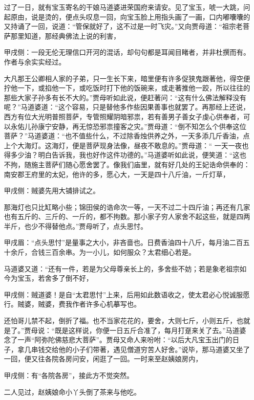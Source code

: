 \begin{parag}
    过了一日，就有宝玉寄名的干娘马道婆进荣国府来请安。见了宝玉，唬一大跳，问起原由，说是烫的，便点头叹息一回，向宝玉脸上用指头画了一画，口内嘟囔囔的又持诵了一回，说道：“管保就好了，这不过是一时飞灾。”又向贾母道：“祖宗老菩萨那里知道，那经典佛法上说的利害，\begin{note}甲戌侧：一段无伦无理信口开河的混话，却句句都是耳闻目睹者，并非杜撰而有。作者与余实实经过。\end{note}大凡那王公卿相人家的子弟，只一生长下来，暗里便有许多促狭鬼跟著他，得空便拧他一下，或掐他一下，或吃饭时打下他的饭碗来，或走著推他一跤，所以往往的那些大家子孙多有长不大的。”贾母听如此说，便赶著问：“这有什么佛法解释没有呢？”马道婆道：“这个容易，只是替他多作些因果善事也就罢了。再那经上还说，西方有位大光明普照菩萨，专管照耀阴暗邪祟，若有善男子善女子虔心供奉者，可以永佑儿孙康宁安静，再无惊恐邪祟撞客之灾。”贾母道：“倒不知怎么个供奉这位菩萨？”马道婆道：“也不值些什么，不过除香烛供养之外，一天多添几斤香油，点上个大海灯。这海灯，便是菩萨现身法像，昼夜不敢息的。”贾母道：“ 一天一夜也得多少油？明白告诉我，我也好作这件功德的。”马道婆听如此说，便笑道：“这也不拘，随施主菩萨们随心愿舍罢了。像我们庙里，就有好几处的王妃诰命供奉的：南安郡王府里的太妃，他许的多，愿心大，一天是四十八斤油，一斤灯草，\begin{note}甲戌侧：贼婆先用大铺排试之。\end{note}那海灯也只比缸略小些；锦田侯的诰命次一等，一天不过二十四斤油；再还有几家也有五斤的、三斤的、一斤的，都不拘数。那小家子穷人家舍不起这些，就是四两半斤，也少不得替他点。”贾母听了，点头思忖。\begin{note}甲戌眉：“点头思忖”是量事之大小，非吝啬也。日费香油四十八斤，每月油二百五十余斤，合钱三百余串。为一小儿，如何服众？太君细心若是。\end{note}马道婆又道：“还有一件，若是为父母尊亲长上的，多舍些不妨；若是象老祖宗如今为宝玉，若舍多了倒不好，\begin{note}甲戌侧：贼道婆！是自“太君思忖”上来，后用如此数语收之，使太君必心悦诚服愿行。贼婆，贼婆，费我作者许多心机摹写也。\end{note}还怕哥儿禁不起，倒折了福。也不当家花花的，要舍，大则七斤，小则五斤，也就是了。”贾母说：“既是这样说，你便一日五斤合准了，每月打趸来关了去。”马道婆念了一声“阿弥陀佛慈悲大菩萨”。贾母又命人来吩咐：“以后大凡宝玉出门的日子，拿几串钱交给他的小子们带著，遇见僧道穷苦人好舍。”说毕，那马道婆又坐了一回，便又往各院各房问安，闲逛了一回。一时来至赵姨娘房内，\begin{note}甲戌侧：有“各院各房”，接此方不觉突然。\end{note}二人见过，赵姨娘命小丫头倒了茶来与他吃。
\end{parag}


